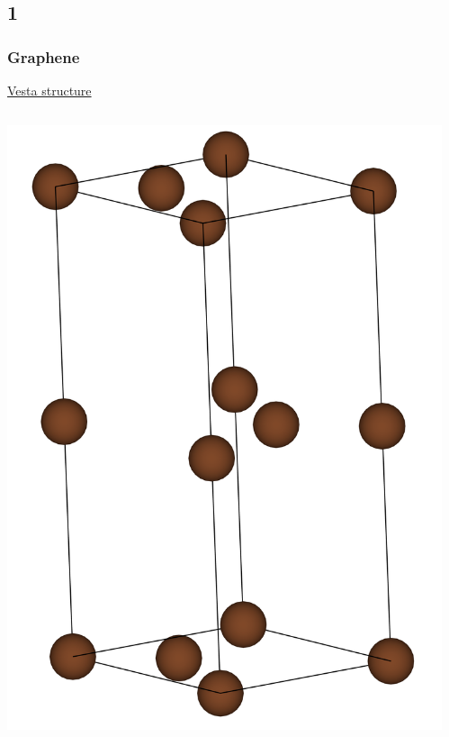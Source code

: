 \documentclass{beamer}
\begin{document}
	\subsection*{1}
		\begin{frame}
			\frametitle{Graphene}
			\underline{Vesta structure}
			\begin{columns}[T] %
				\begin{column}{.48\textwidth}
					\includegraphics[width=\textwidth]{figures/graphite.png}
				\end{column}%
				\hfill%
				\begin{column}{.48\textwidth}

\end{column}
\end{columns}
\end{frame}
\end{document}
